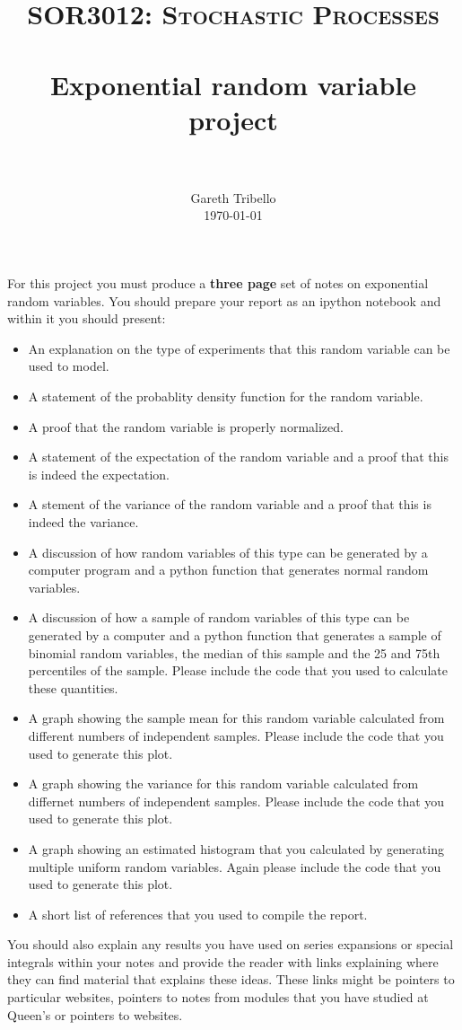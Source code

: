 \documentclass[paper=a4, fontsize=11pt]{scrartcl}
\title{\usefont{OT1}{bch}{b}{n} \normalfont \normalsize \textsc{SOR3012:
Stochastic Processes} \\ [25pt] \horrule{0.5pt} \\[0.4cm] 
\huge Exponential random variable project \\
\horrule{2pt} \\[0.25cm]
}
\author{ \normalfont
\normalsize
        Gareth Tribello \\[-3pt] \normalsize
        \today
}
\date{}
\numberwithin{equation}{section}
\numberwithin{figure}{section}
\numberwithin{table}{section}
\begin{document}
\maketitle

For this project you must produce a {\bf three page} set of notes on exponential random variables.  You should prepare your report as an ipython notebook and within it you should present:

\begin{itemize}
 \item An explanation on the type of experiments that this random variable can be used to model. 
 \item A statement of the probablity density function for the random variable.
 \item A proof that the random variable is properly normalized.
 \item A statement of the expectation of the random variable and a proof that this is indeed the expectation.
 \item A stement of the variance of the random variable and a proof that this is indeed the variance.
 \item A discussion of how random variables of this type can be generated by a computer program and a python function that generates normal random variables.
 \item A discussion of how a sample of random variables of this type can be generated by a computer and a python function that generates a sample of binomial random variables, the median of this sample and the 25 and 75th percentiles of the sample.  Please include the code that you used to calculate these quantities.
 \item A graph showing the sample mean for this random variable calculated from different numbers of independent samples.  Please include the code that you used to generate this plot.
 \item A graph showing the variance for this random variable calculated from differnet numbers of independent samples.  Please include the code that you used to generate this plot.
 \item A graph showing an estimated histogram that you calculated by generating multiple uniform random variables.  Again please include the code that you used to generate this plot.
 \item A short list of references that you used to compile the report.
\end{itemize}

You should also explain any results you have used on series expansions or special integrals within your notes and provide the reader with links explaining where they can find material that explains 
these ideas.  These links might be pointers to particular websites, pointers to notes from modules that you have studied at Queen's or pointers to websites.
\end{document}
